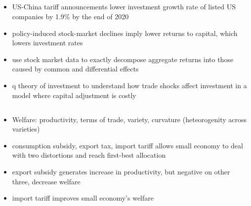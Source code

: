 \documentclass[10pt]{article} %
\begin{document}
    \subsection{\cite{AmitiKongWeinstein2020}}
    \begin{itemize}
        \item US-China tariff announcements lower investment growth rate of listed US companies by 1.9\% by the end of 2020
        \item policy-induced stock-market declines imply lower returns to capital, which lowers investment rates
        \item use stock market data to exactly decompose aggregate returns into those caused by common and differential effects
        \item q theory of investment to understand how trade shocks affect investment in a model where capital adjustment is costly
    \end{itemize}

    \subsection{\cite{AkcigitAtesImpullitti2018}}
    
	\subsection{\cite{Fernandesetal2023}}
    
    \subsection{\cite{MartinMejeanParenti2023}}

    \subsection{\cite{DemidovaRodriguezClare2009}}
    \begin{itemize}
        \item Welfare: productivity, terms of trade, variety, curvature (heteorogenity across varieties)
        \item consumption subsidy, export tax, import tariff allows small economy to deal with two distortions and reach first-best allocation
        \item export subsidy generates increase in productivity, but negative on other three, decrease welfare
        \item import tariff improves small economy's welfare
    \end{itemize}
\end{document}

